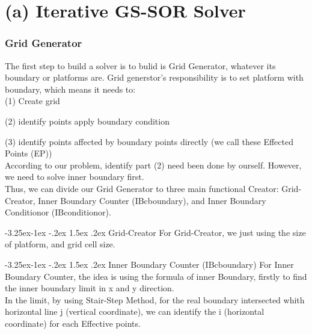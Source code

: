 \documentclass[12pt]{article}
\makeatletter
\renewcommand\paragraph{\@startsection{paragraph}{4}{\z@}%
                                     {-3.25ex\@plus -1ex \@minus -.2ex}%
                                     {1.5ex \@plus .2ex}%
                                     {\normalfont\normalsize\bfseries}}
\makeatother
\begin{document}
    








\section{(a) Iterative GS-SOR Solver}

\subsubsection{Grid Generator}
The first step to build a solver is to bulid is 
Grid Generator, whatever its boundary or platforms are.
Grid generstor's responsibility is to set platform with boundary,
which means it needs to:\\

(1) Create grid 

(2) identify points apply boundary condition

(3) identify points affected by boundary points directly 
(we call these Effected Points (EP))\\

According to our problem, identify part (2) need been done by ourself.
However, we need to solve inner boundary first.\\


Thus, we can divide our Grid Generator to three main functional
Creator: Grid-Creator, Inner Boundary Counter (IBcboundary), and 
Inner Boundary Conditionor (IBconditionor).

\paragraph{Grid-Creator}
For Grid-Creator, we just using the size of platform, and grid cell size.

\paragraph{Inner Boundary Counter (IBcboundary)}
For Inner Boundary Counter, the idea is using the formula of
inner Boundary, firstly to find the inner boundary limit in x and y 
direction.\\


In the limit, by using Stair-Step Method, for the real boundary intersected
whith horizontal line j (vertical coordinate), 
we can identify the i (horizontal coordinate)
for each Effective points.\\
\end{document}
